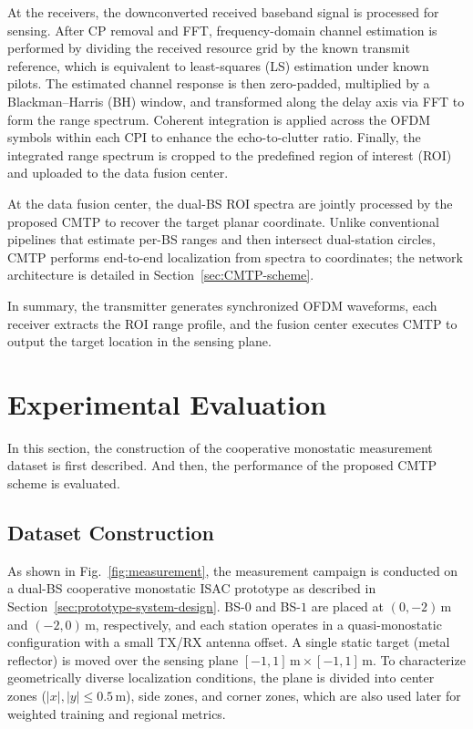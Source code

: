 \documentclass[sigconf]{acmart}
\begin{document}
At the receivers, the downconverted received baseband signal is processed for sensing. After CP removal and FFT, frequency-domain channel estimation is performed by dividing the received resource grid by the known transmit reference, which is equivalent to least-squares (LS) estimation under known pilots. The estimated channel response is then zero-padded, multiplied by a Blackman--Harris (BH) window, and transformed along the delay axis via FFT to form the range spectrum. Coherent integration is applied across the OFDM symbols within each CPI to enhance the echo-to-clutter ratio. Finally, the integrated range spectrum is cropped to the predefined region of interest (ROI) and uploaded to the data fusion center.

At the data fusion center, the dual-BS ROI spectra are jointly processed by the proposed CMTP to recover the target planar coordinate. Unlike conventional pipelines that estimate per-BS ranges and then intersect dual-station circles, CMTP performs end-to-end localization from spectra to coordinates; the network architecture is detailed in Section~\ref{sec:CMTP-scheme}.

In summary, the transmitter generates synchronized OFDM waveforms, each receiver extracts the ROI range profile, and the fusion center executes CMTP to output the target location in the sensing plane.

\section{Experimental Evaluation}
In this section, the construction of the cooperative monostatic measurement dataset is first described. And then, the performance of the proposed CMTP scheme is evaluated.

\subsection{Dataset Construction}
As shown in Fig.~\ref{fig:measurement}, the measurement campaign is conducted on a dual-BS cooperative monostatic ISAC prototype as described in Section~\ref{sec:prototype-system-design}. BS-$0$ and BS-$1$ are placed at $(0,-2)\,\mathrm{m}$ and $(-2,0)\,\mathrm{m}$, respectively, and each station operates in a quasi-monostatic configuration with a small TX/RX antenna offset. A single static target (metal reflector) is moved over the sensing plane $[-1,1]\,\mathrm{m}\times[-1,1]\,\mathrm{m}$. To characterize geometrically diverse localization conditions, the plane is divided into center zones ($|x|,|y|\le 0.5\,\mathrm{m}$), side zones, and corner zones, which are also used later for weighted training and regional metrics.
\end{document}
